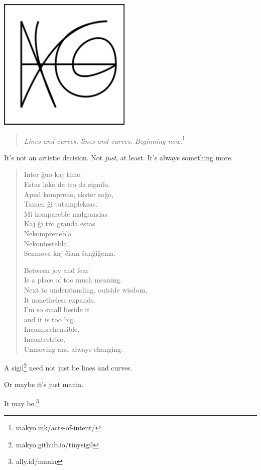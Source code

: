 \begin{paracol}{2}
\begin{rightcolumn}
    \null
    \vfill
    \noindent\includegraphics[width=2.5in]{assets/3.png}

    \begin{quote}
    \emph{Lines and curves, lines and curves. Beginning now.}\footnote{makyo.ink/acts-of-intent/}
    \end{quote}
\end{rightcolumn}
\begin{leftcolumn}
\noindent It's not an artistic decision. Not \emph{just}, at least. It's always something more.

\begin{verse}
Inter ĝuo kaj timo\\
Estas loko de tro da signifo.\\
Apud kompreno, ekster saĝo,\\
Tamen ĝi tutampleksas.\\
Mi kompareble malgrandas\\
Kaj ĝi tro granda estas.\\
Nekomprenebla\\
Nekontestebla,\\
Senmova kaj ĉiam ŝanĝiĝema.

Between joy and fear\\
Is a place of too much meaning.\\
Next to understanding, outside wisdom,\\
It nonetheless expands.\\
I'm so small beside it\\
and it is too big.\\
Incomprehensible,\\
Incontestible,\\
Unmoving and always changing.
\end{verse}

\noindent A sigil\footnote{makyo.github.io/tinysigil} need not just be lines and curves.

\begin{ally}
Or maybe it's just mania.
\end{ally}
It may be.\footnote{ally.id/mania}
\newpage
\end{leftcolumn}
\end{paracol}
